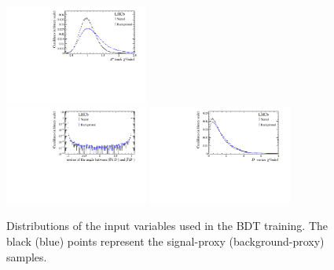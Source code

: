 \begin{figure}[tbp]
\begin{center}
		\includegraphics[width=0.42\textwidth]{07selection/figs/BDTInputs/ab1_TRACK_CHI2NDOF.pdf}\\
		\includegraphics[width=0.42\textwidth]{07selection/figs/BDTInputs/ab2_DIRA_ORIVX.pdf}
		\includegraphics[width=0.42\textwidth]{07selection/figs/BDTInputs/ab2_ENDVERTEX_CHI2NDOF.pdf}
	\end{center}
	\caption{Distributions of the input variables used in the BDT training.
	The black (blue) points represent the signal-proxy (background-proxy) samples.}
	\label{fig:BDTInput1}
\end{figure}
